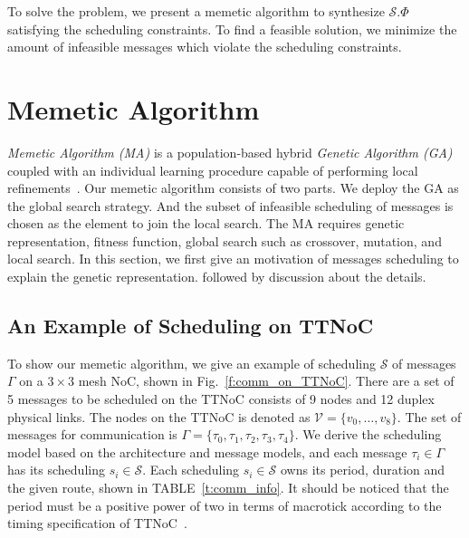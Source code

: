 \documentclass[10pt,journal]{IEEEtran}
\newcommand{\calV}{\mathcal{V}}
\newcommand{\calS}{\mathcal{S}}
\theoremstyle{remark}
\begin{document}
To solve the problem, we present a memetic algorithm to synthesize
$\calS.\Phi$ satisfying the scheduling constraints. 
To find a feasible solution,
 we minimize the amount of infeasible messages which violate the scheduling constraints.



\section{Memetic Algorithm \label{s:algorithm}}
\emph{Memetic Algorithm (MA)} is a population-based hybrid
\emph{Genetic Algorithm (GA)} coupled with an individual learning
procedure capable of performing local refinements~\cite{DBLP:journals/cim/OngLC10}.
Our memetic algorithm consists of two parts. We deploy the GA as the global search strategy.
And the subset of infeasible scheduling of messages is chosen as the element to join the local search.
The MA requires genetic representation,
 fitness function,
  global search such as crossover, mutation,
   and local search. 
In this section, we first give an motivation of messages scheduling to explain the genetic representation.
followed by discussion about the details.

\subsection{An Example of Scheduling on TTNoC}
To show our memetic algorithm,
 we give an example of scheduling $\calS$ of messages $\Gamma$ on a $3\times 3$ mesh NoC,
 shown in Fig.~\ref{f:comm_on_TTNoC}. 
There are a set of 5 messages to be scheduled on the TTNoC consists of 9 nodes and 12 duplex physical links.
The nodes on the TTNoC is denoted as $\calV=\{v_0,\dots,v_8\}$.
The set of messages for communication is $\Gamma=\{\tau_0,\tau_1,\tau_2,\tau_3,\tau_4\}$.
We derive the scheduling model based on the architecture and message models,
 and each message $\tau_i\in\Gamma$ has its scheduling $s_i\in\calS$.
Each scheduling $s_i\in\calS$ owns its period, duration and the given route,
shown in TABLE~\ref{t:comm_info}.
It should be noticed that the period must be a positive power of two in terms of macrotick according to the timing specification of TTNoC~\cite{DBLP:conf/date/HuangBRBK12}.
\end{document}

